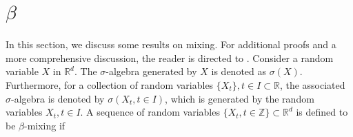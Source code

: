 \documentclass[twoside,11pt]{article}
\begin{document}


\section{$\beta$}
\label{beta_mix_intro}
In this section, we discuss some results on mixing. For additional proofs and a more comprehensive discussion, the reader is directed to \cite{doukhan2012mixing}. Consider a random variable \(X\) in \(\mathbb{R}^d\). The \(\sigma\)-algebra generated by \(X\) is denoted as \(\sigma(X)\). Furthermore, for a collection of random variables \( \{X_t\}, t \in I \subset \mathbb{R} \), the associated \(\sigma\)-algebra is denoted by \(\sigma(X_t, t \in I)\), which is generated by the random variables \( X_t, t \in I \). A sequence of random variables \( \{X_t, t \in \mathbb{Z}\} \subset \mathbb{R}^d \) is defined to be \(\beta\)-mixing if
\end{document}

